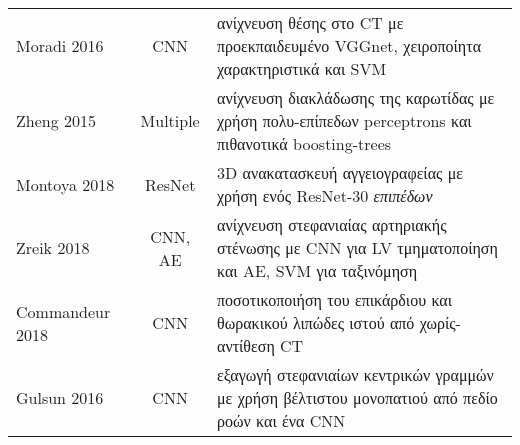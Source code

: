 \begin{sidewaystable}
\begin{tabular}{l c l}
		Moradi 2016~\cite{moradi2016hybrid}           & CNN             & ανίχνευση θέσης στο CT με προεκπαιδευμένο VGGnet, χειροποίητα χαρακτηριστικά και SVM                                                                                                                                                                                                                                                            \\
		Zheng 2015~\cite{zheng20153d}                 & Multiple        & ανίχνευση διακλάδωσης της καρωτίδας με χρήση πολυ-επίπεδων perceptrons και πιθανοτικά boosting-trees                                                                                                                                                                                                                                                                             \\
		Montoya 2018~\cite{montoya2018deep}           & ResNet          & 3D ανακατασκευή αγγειογραφείας με χρήση ενός ResNet-30 \textit{επιπέδων}                                                                                                                                                                                                                                                                                                                    \\
		Zreik 2018~\cite{zreik2018deep}               & CNN, AE         & ανίχνευση στεφανιαίας αρτηριακής στένωσης με CNN για LV τμηματοποίηση και AE, SVM για ταξινόμηση                                                                                                                                                                                                                                                                              \\
		Commandeur 2018~\cite{commandeur2018deep}     & CNN             & ποσοτικοποιήση του επικάρδιου και θωρακικού λιπώδες ιστού από χωρίς-αντίθεση CT                                                                                                                                                                                                                                                                                                             \\
		Gulsun 2016~\cite{gulsun2016coronary}         & CNN             & εξαγωγή στεφανιαίων κεντρικών γραμμών με χρήση βέλτιστου μονοπατιού από πεδίο ροών και ένα CNN                                                                                                                                                                                                                                                                                              \\
		\bottomrule
	\end{tabular}
\end{sidewaystable}

